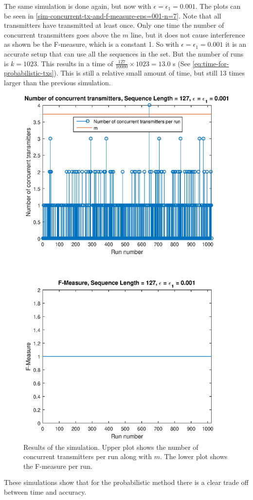 The same simulation is done again, but now with $\epsilon = \epsilon_1 = 0.001$.
The plots can be seen in \autoref{sim-concurrent-tx-and-f-measure-eps=001-n=7}.
Note that all transmitters have transmitted at least once.
Only one time the number of concurrent transmitters goes above the $m$ line, but it does not cause interference as shown be the F-measure, which is a constant 1.
So with $\epsilon = \epsilon_1 = 0.001$ it is an accurate setup that can use all the sequences in the set.
But the number of runs is $k = 1023$.
This results in a time of $\frac{127}{10000} \times 1023 = 13.0$ s (See \autoref{eq:time-for-probabilistic-txs}).
This is still a relative small amount of time, but still 13 times larger than the previous simulation.


\begin{figure}[tbp]
	\centering
	\includegraphics[width=\textwidth]{chapters/evaluation-chapters/simulation/sim-concurrent-tx-and-f-measure-eps=001-n=7.eps}
	\caption{Results of the simulation. Upper plot shows the number of concurrent transmitters per run along with $m$. The lower plot shows the F-measure per run.}
	\label{fig:sim-concurrent-tx-and-f-measure-eps=001-n=7}
\end{figure}



These simulations show that for the probabilistic method there is a clear trade off between time and accuracy.